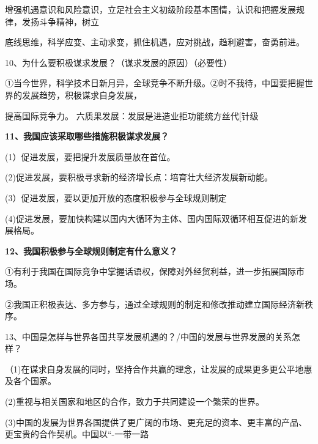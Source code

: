 \documentclass[lang=cn,11pt]{elegantbook}
\newcommand{\daofasym}[1]{{\daofasymbolfont #1}}
\newcommand{\daofasym}[1]{#1}
\begin{document}
增强机遇意识和风险意识，立足社会主义初级阶段基本国情，认识和把握发展规律，发扬斗争精神，树立\par

底线思维，科学应变、主动求变，抓住机遇，应对挑战，趋利避害，奋勇前进。\par

10、为什么要积极谋求发展？（谋求发展的原因）（必要性）\par

\daofasym{①}当今世界，科学技术日新月异，全球竞争不断升级。\daofasym{②}时不我待，中国要把握世界的发展趋势，积极谋求自身发展，\par

提高国际竞争力。 六质果发展：发展是进造业拒功能统方丝代[针级\par

\textbf{11、我国应该采取哪些措施积极谋求发展？}\par

(1）促进发展，要把提升发展质量放在首位。\par

(2)促进发展，要积极寻求新的经济增长点：培育壮大经济发展新动能。\par

(3）促进发展，要以更加开放的态度积极参与全球规则制定\par

(4)促进发展，要加快构建以国内大循环为主体、国内国际双循环相互促进的新发展格局。\par

\textbf{12、我国积极参与全球规则制定有什么意义？}\par

\daofasym{①}有利于我国在国际竞争中掌握话语权，保障对外经贸利益，进一步拓展国际市场。\par

\daofasym{②}我国正积极表达、多方参与，通过全球规则的制定和修改推动建立国际经济新秩序。\par

13、中国是怎样与世界各国共享发展机遇的？/中国的发展与世界发展的关系怎样？\par

（1)在谋求自身发展的同时，坚持合作共赢的理念，让发展的成果更多更公平地惠及各个国家。\par

(2)重视与相关国家和地区的合作，致力于共同建设一个繁荣的世界。\par

(3)中国的发展为世界各国提供了更广阔的市场、更充足的资本、更丰富的产品、更宝贵的合作契机。中国以“-一带一路\par
\end{document}
